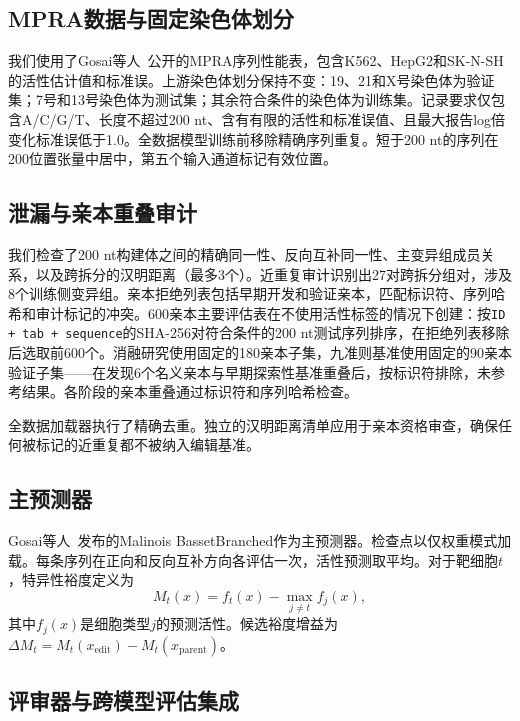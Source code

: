 \subsection{MPRA数据与固定染色体划分}

我们使用了Gosai等人~\citep{Gosai2024}公开的MPRA序列性能表，包含K562、HepG2和SK-N-SH的活性估计值和标准误。上游染色体划分保持不变：19、21和X号染色体为验证集；7号和13号染色体为测试集；其余符合条件的染色体为训练集。记录要求仅包含A/C/G/T、长度不超过200 nt、含有有限的活性和标准误值、且最大报告log倍变化标准误低于1.0。全数据模型训练前移除精确序列重复。短于200 nt的序列在200位置张量中居中，第五个输入通道标记有效位置。

\subsection{泄漏与亲本重叠审计}

我们检查了200 nt构建体之间的精确同一性、反向互补同一性、主变异组成员关系，以及跨拆分的汉明距离（最多3个）。近重复审计识别出27对跨拆分组对，涉及8个训练侧变异组。亲本拒绝列表包括早期开发和验证亲本，匹配标识符、序列哈希和审计标记的冲突。600亲本主要评估表在不使用活性标签的情况下创建：按\texttt{ID + tab + sequence}的SHA-256对符合条件的200 nt测试序列排序，在拒绝列表移除后选取前600个。消融研究使用固定的180亲本子集，九准则基准使用固定的90亲本验证子集——在发现6个名义亲本与早期探索性基准重叠后，按标识符排除，未参考结果。各阶段的亲本重叠通过标识符和序列哈希检查。

全数据加载器执行了精确去重。独立的汉明距离清单应用于亲本资格审查，确保任何被标记的近重复都不被纳入编辑基准。

\subsection{主预测器}

Gosai等人~\citep{Gosai2024}发布的Malinois BassetBranched作为主预测器。检查点以仅权重模式加载。每条序列在正向和反向互补方向各评估一次，活性预测取平均。对于靶细胞$t$，特异性裕度定义为
\begin{equation}
M_t(x)=f_t(x)-\max_{j\ne t} f_j(x),
\end{equation}
其中$f_j(x)$是细胞类型$j$的预测活性。候选裕度增益为$\Delta M_t=M_t(x_{\mathrm{edit}})-M_t(x_{\mathrm{parent}})$。

\subsection{评审器与跨模型评估集成}

